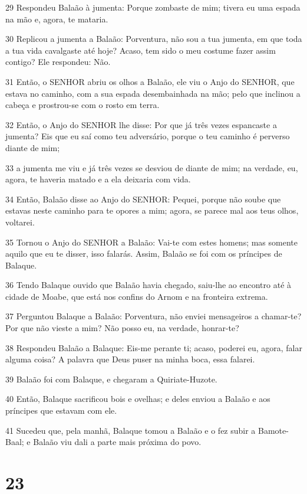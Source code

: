 \par 29 Respondeu Balaão à jumenta: Porque zombaste de mim; tivera eu uma espada na mão e, agora, te mataria.
\par 30 Replicou a jumenta a Balaão: Porventura, não sou a tua jumenta, em que toda a tua vida cavalgaste até hoje? Acaso, tem sido o meu costume fazer assim contigo? Ele respondeu: Não.
\par 31 Então, o SENHOR abriu os olhos a Balaão, ele viu o Anjo do SENHOR, que estava no caminho, com a sua espada desembainhada na mão; pelo que inclinou a cabeça e prostrou-se com o rosto em terra.
\par 32 Então, o Anjo do SENHOR lhe disse: Por que já três vezes espancaste a jumenta? Eis que eu saí como teu adversário, porque o teu caminho é perverso diante de mim;
\par 33 a jumenta me viu e já três vezes se desviou de diante de mim; na verdade, eu, agora, te haveria matado e a ela deixaria com vida.
\par 34 Então, Balaão disse ao Anjo do SENHOR: Pequei, porque não soube que estavas neste caminho para te opores a mim; agora, se parece mal aos teus olhos, voltarei.
\par 35 Tornou o Anjo do SENHOR a Balaão: Vai-te com estes homens; mas somente aquilo que eu te disser, isso falarás. Assim, Balaão se foi com os príncipes de Balaque.
\par 36 Tendo Balaque ouvido que Balaão havia chegado, saiu-lhe ao encontro até à cidade de Moabe, que está nos confins do Arnom e na fronteira extrema.
\par 37 Perguntou Balaque a Balaão: Porventura, não enviei mensageiros a chamar-te? Por que não vieste a mim? Não posso eu, na verdade, honrar-te?
\par 38 Respondeu Balaão a Balaque: Eis-me perante ti; acaso, poderei eu, agora, falar alguma coisa? A palavra que Deus puser na minha boca, essa falarei.
\par 39 Balaão foi com Balaque, e chegaram a Quiriate-Huzote.
\par 40 Então, Balaque sacrificou bois e ovelhas; e deles enviou a Balaão e aos príncipes que estavam com ele.
\par 41 Sucedeu que, pela manhã, Balaque tomou a Balaão e o fez subir a Bamote-Baal; e Balaão viu dali a parte mais próxima do povo.

\chapter{23}

